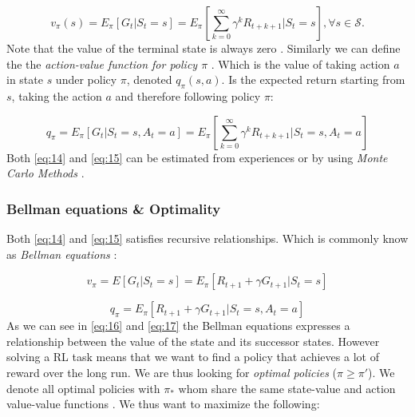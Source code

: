 \documentclass{kththesis}
\theoremstyle{definition}
\begin{document}
\begin{equation}
    \label{eq:14}
    v_{\pi}(s) = E_{\pi}[G_t | S_t = s] = E_{\pi}\left[\sum_{k=0}^{\infty}{\gamma^{k}R_{t+k+1}} | S_t = s\right], \forall s \in \mathcal{S}.
\end{equation}
Note that the value of the terminal state is always zero \parencite{sutton1998reinforcement}. Similarly  we can define the the \textit{action-value function for policy $\pi$} \parencite{sutton1998reinforcement}. Which is the value of taking action $a$ in state $s$ under policy $\pi$, denoted $q_{\pi}(s,a)$. Is the expected return starting from $s$, taking the action $a$ and therefore following policy $\pi$:

\begin{equation}
    \label{eq:15}
    q_{\pi} = E_{\pi}[G_t | S_t =s, A_t = a] = E_{\pi} \left[\sum_{k=0}^{\infty}{\gamma^{k}R_{t+k+1}} | S_t=s, A_t=a \right]
\end{equation}
Both \autoref{eq:14} and \autoref{eq:15} can be estimated from experiences or by using \textit{Monte Carlo Methods} \parencite{sutton1998reinforcement}.

\subsubsection*{Bellman equations \& Optimality}
Both \autoref{eq:14} and \autoref{eq:15} satisfies recursive relationships. Which is commonly know as \textit{Bellman equations} \parencite{sutton1998reinforcement}:

\begin{equation}
    \label{eq:16}
    v_{\pi} = E[G_t | S_t = s] = E_{\pi}[R_{t+1} + \gamma G_{t+1} | S_t = s]
\end{equation}

\begin{equation}
    \label{eq:17}
    q_{\pi} = E_{\pi}[R_{t+1} + \gamma G_{t+1} | S_t = s,  A_t = a]
\end{equation}
As we can see in \autoref{eq:16} and \autoref{eq:17} the Bellman equations expresses a relationship between the value of the state and its successor states. However solving a RL task means that we want to find a policy that achieves a lot of reward over the long run. We are thus looking for \textit{optimal policies} ($\pi \geq \pi'$). We denote all optimal policies with $\pi_{*}$ whom share the same state-value and action value-value functions \parencite{sutton1998reinforcement}. We thus want to maximize the following:
\end{document}
